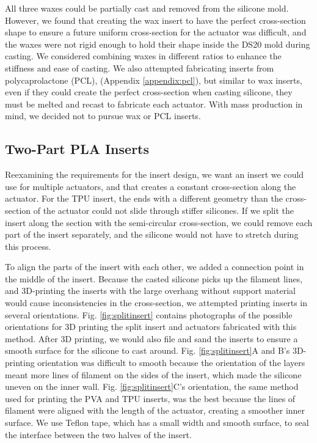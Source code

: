 All three waxes could be partially cast and removed from the silicone mold. However, we found that creating the wax insert to have the perfect cross-section shape to ensure a future uniform cross-section for the actuator was difficult, and the waxes were not rigid enough to hold their shape inside the DS20 mold during casting. We considered combining waxes in different ratios to enhance the stiffness and ease of casting. We also attempted fabricating inserts from polycaprolactone (PCL), (Appendix \ref{appendix:pcl}), but similar to wax inserts, even if they could create the perfect cross-section when casting silicone, they must be melted and recast to fabricate each actuator. 
With mass production in mind, we decided not to pursue wax or PCL inserts. 

\subsection{Two-Part PLA Inserts}

Reexamining the requirements for the insert design, we want an insert we could use for multiple actuators, and that creates a constant cross-section along the actuator. For the TPU insert, the ends with a different geometry than the cross-section of the actuator could not slide through stiffer silicones. If we split the insert along the section with the semi-circular cross-section, we could remove each part of the insert separately, and the silicone would not have to stretch during this process. 

To align the parts of the insert with each other, we added a connection point in the middle of the insert. Because the casted silicone picks up the filament lines, and 3D-printing the inserts with the large overhang without support material would cause inconsistencies in the cross-section, we attempted printing inserts in several orientations. Fig. \ref{fig:splitinsert} contains photographs of the possible orientations for 3D printing the split insert and actuators fabricated with this method. After 3D printing, we would also file and sand the inserts to ensure a smooth surface for the silicone to cast around. Fig. \ref{fig:splitinsert}A and B's 3D-printing orientation was difficult to smooth because the orientation of the layers meant more lines of filament on the sides of the insert, which made the silicone uneven on the inner wall. Fig. \ref{fig:splitinsert}C's orientation, the same method used for printing the PVA and TPU inserts, was the best because the lines of filament were aligned with the length of the actuator, creating a smoother inner surface. We use Teflon tape, which has a small width and smooth surface, to seal the interface between the two halves of the insert. \\

